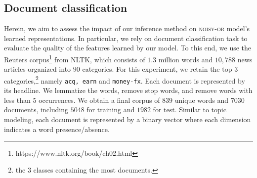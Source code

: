 \documentclass[twoside]{article}
\begin{document}
\subsection{Document classification}
Herein, we aim to assess the impact of our inference method on \textsc{noisy-or} model's learned representations.
In particular, we rely on document classification task to evaluate the quality of the features learned by our model. 
To this end, we use the Reuters corpus\footnote{https://www.nltk.org/book/ch02.html} from NLTK, which consists of $1.3$ million words and $10, 788$ news articles organized into $90$ categories. For this experiment, we retain the top $3$ categories,\footnote{the 3 classes containing the most documents.} namely \texttt{acq, earn} and \texttt{money-fx}. Each document is represented by its headline. 
We lemmatize the words, remove stop words, and remove words with less than $5$ occurrences. We obtain a final corpus of  $839$ unique words and $7030$ documents, including $5048$ for training and $1982$ for test. Similar to topic modeling, each document  is represented by a binary vector where each dimension indicates a word presence/absence. 
\end{document}
